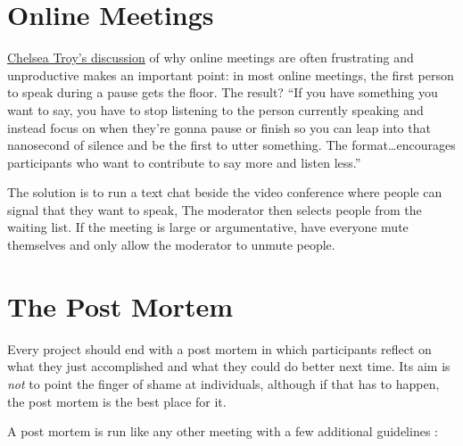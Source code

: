 \section{Online Meetings}\label{s:meetings-online}

\href{https://chelseatroy.com/2018/03/29/why-do-remote-meetings-suck-so-much/}{Chelsea Troy's discussion}
of why online meetings are often frustrating and unproductive
makes an important point:
in most online meetings,
the first person to speak during a pause gets the floor.
The result?
``If you have something you want to say,
you have to stop listening to the person currently speaking
and instead focus on when they're gonna pause or finish
so you can leap into that nanosecond of silence and be the first to utter something.
The format{\ldots}encourages participants who want to contribute to say more and listen less.''

The solution is to run a text chat beside the video conference
where people can signal that they want to speak,
The moderator then selects people from the waiting list.
If the meeting is large or argumentative,
have everyone mute themselves
and only allow the moderator to unmute people.

\section{The Post Mortem}\label{s:meetings-post-mortem}

Every project should end with a post mortem
in which participants reflect on what they just accomplished
and what they could do better next time.
Its aim is \emph{not} to point the finger of shame at individuals,
although if that has to happen,
the post mortem is the best place for it.

A post mortem is run like any other meeting
with a few additional guidelines \cite{Derb2006}:


